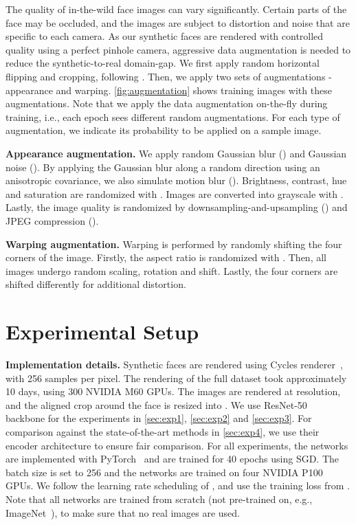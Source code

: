 \documentclass[10pt,twocolumn,letterpaper]{article}
\begin{document}
The quality of in-the-wild face images can vary significantly. 
Certain parts of the face may be occluded, and the images are subject to distortion and noise that are specific to each camera. 
As our synthetic faces are rendered with controlled quality using a perfect pinhole camera, aggressive data augmentation is needed to reduce the synthetic-to-real domain-gap. 
We first apply random horizontal flipping and cropping, following \cite{2022_FR_adaface}. 
Then, we apply two sets of augmentations - appearance and warping. 
\autoref{fig:augmentation} shows training images with these augmentations. Note that we apply the data augmentation on-the-fly during training, i.e., each epoch sees different random augmentations.
For each type of augmentation, we indicate its probability  to be applied on a sample image. 

\noindent
\textbf{Appearance augmentation.} We apply random Gaussian blur () and Gaussian noise (). By applying the Gaussian blur along a random direction using an anisotropic covariance, we also simulate motion blur (). Brightness, contrast, hue and saturation are randomized with .
Images are converted into grayscale with . Lastly, the image quality is randomized by downsampling-and-upsampling () and JPEG compression (). 

\noindent
\textbf{Warping augmentation.} Warping is performed by randomly shifting the four corners of the image. Firstly, the aspect ratio is randomized with . Then, all images undergo random scaling, rotation and shift. Lastly, the four corners are shifted differently for additional distortion. 




\section{Experimental Setup}
\label{sec:exp_setup}

\noindent
\textbf{Implementation details.} 
Synthetic faces are rendered using Cycles renderer~\cite{cycles}, with 256 samples per pixel. 
The rendering of the full dataset took approximately 10 days, using 300 NVIDIA M60 GPUs. 
The images are rendered at  resolution, and the aligned crop around the face is resized into . 
We use ResNet-50~\cite{2016_resnet} backbone for the experiments in \autoref{sec:exp1}, \ref{sec:exp2} and \ref{sec:exp3}. 
For comparison against the state-of-the-art methods in \autoref{sec:exp4}, we use their encoder architecture to ensure fair comparison. 
For all experiments, the networks are implemented with PyTorch~\cite{PyTorch} and are trained for 40 epochs using SGD. 
The batch size is set to 256 and the networks are trained on four NVIDIA P100 GPUs. 
We follow the learning rate scheduling of \cite{2021_FR_synface}, and use the training loss from \cite{2022_FR_adaface}. 
Note that all networks are trained from scratch (not pre-trained on, e.g., ImageNet~\cite{2009_imagenet}), to make sure that no real images are used.
\end{document}
